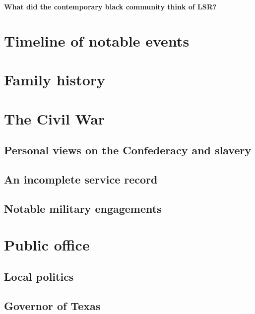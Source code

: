 \documentclass[12pt]{article}
\begin{document}
\textbf{What did the contemporary black community think of LSR? \\}


\newpage
\section{Timeline of notable events}

\newpage
\section{Family history}

\newpage
\section{The Civil War}

\subsection{Personal views on the Confederacy and slavery}

\subsection{An incomplete service record}

\subsection{Notable military engagements}

\newpage
\section{Public office}

\subsection{Local politics}

\subsection{Governor of Texas}
\end{document}
